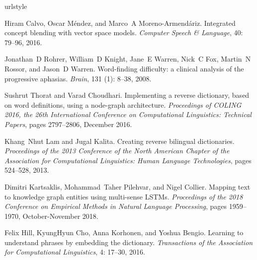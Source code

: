 \documentclass{article}
\begin{document}
\begin{thebibliography}{45}
\providecommand{\natexlab}[1]{#1}
\providecommand{\url}[1]{\texttt{#1}}
\expandafter\ifx\csname urlstyle\endcsname\relax
  \providecommand{\doi}[1]{doi: #1}\else
  \providecommand{\doi}{doi: \begingroup \urlstyle{rm}\Url}\fi

Hiram Calvo, Oscar M{\'e}ndez, and Marco~A Moreno-Armend{\'a}riz.
\newblock Integrated concept blending with vector space models.
\newblock \emph{Computer Speech \& Language}, 40: 79--96, 2016.

Jonathan~D Rohrer, William~D Knight, Jane~E Warren, Nick~C Fox, Martin~N
  Rossor, and Jason~D Warren.
\newblock Word-finding difficulty: a clinical analysis of the progressive
  aphasias.
\newblock \emph{Brain}, 131 (1): 8--38, 2008.

Sushrut Thorat and Varad Choudhari.
\newblock Implementing a reverse dictionary, based on word definitions, using a
  node-graph architecture.
\newblock \emph{Proceedings of {COLING} 2016, the 26th International Conference
  on Computational Linguistics: Technical Papers}, pages 2797--2806, December
  2016.

Khang~Nhut Lam and Jugal Kalita.
\newblock Creating reverse bilingual dictionaries.
\newblock \emph{Proceedings of the 2013 Conference of the North American
  Chapter of the Association for Computational Linguistics: Human Language
  Technologies}, pages 524--528, 2013.

Dimitri Kartsaklis, Mohammad~Taher Pilehvar, and Nigel Collier.
\newblock Mapping text to knowledge graph entities using multi-sense {LSTM}s.
\newblock \emph{Proceedings of the 2018 Conference on Empirical Methods in
  Natural Language Processing}, pages 1959--1970, October-November 2018.

Felix Hill, KyungHyun Cho, Anna Korhonen, and Yoshua Bengio.
\newblock Learning to understand phrases by embedding the dictionary.
\newblock \emph{Transactions of the Association for Computational Linguistics},
  4: 17--30, 2016.


\end{thebibliography}
\end{document}
